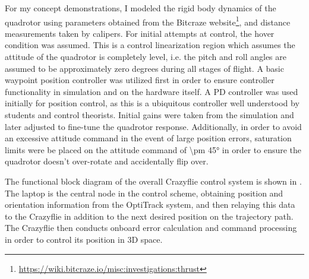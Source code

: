 For my concept demonstrations, I modeled the rigid body dynamics of the quadrotor using parameters obtained from the Bitcraze website\footnote{\url{https://wiki.bitcraze.io/misc:investigations:thrust}}, and distance measurements taken by calipers. For initial attempts at control, the hover condition was assumed. This is a control linearization region which assumes the attitude of the quadrotor is completely level, i.e. the pitch and roll angles are assumed to be approximately zero degrees during all stages of flight. A basic waypoint position controller was utilized first in order to ensure controller functionality in simulation and on the hardware itself. A PD controller was used initially for position control, as this is a ubiquitous controller well understood by students and control theorists. Initial gains were taken from the simulation \cite{hartman2014quadcopter}
 and later adjusted to fine-tune the quadrotor response. Additionally, in order to avoid an excessive attitude command in the event of large position errors, saturation limits were be placed on the attitude command of \ang{\pm 45} in order to ensure the quadrotor doesn't over-rotate and accidentally flip over. 

The functional block diagram of the overall Crazyflie control system is shown in . The laptop is the central node in the control scheme, obtaining position and orientation information from the OptiTrack system, and then relaying this data to the Crazyflie in addition to the next desired position on the trajectory path. The Crazyflie then conducts onboard error calculation and command processing in order to control its position in 3D space.


